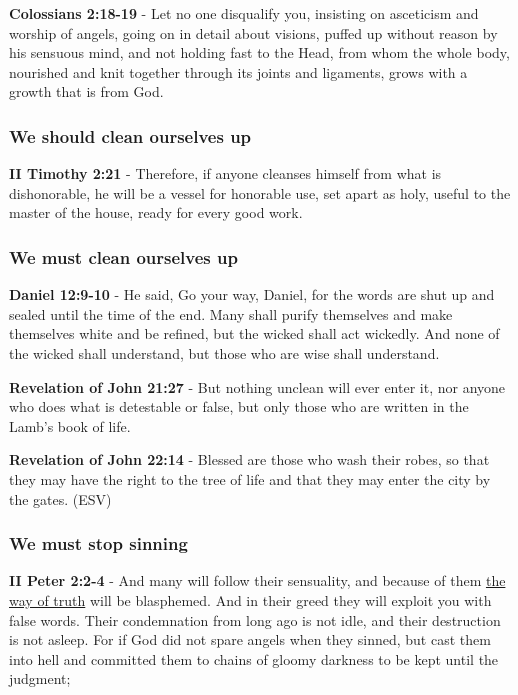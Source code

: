 \documentclass[11pt]{article}
\begin{document}
\textbf{Colossians 2:18-19} - Let no one disqualify you, insisting on asceticism and worship of angels, going on in detail about visions, puffed up without reason by his sensuous mind, and not holding fast to the Head, from whom the whole body, nourished and knit together through its joints and ligaments, grows with a growth that is from God.

\subsubsection{We \textbf{should} clean ourselves up}
\label{sec:org6526507}
\textbf{II Timothy 2:21} - Therefore, if anyone cleanses himself from what is dishonorable, he will be a vessel for honorable use, set apart as holy, useful to the master of the house, ready for every good work.

\subsubsection{We \textbf{must} clean ourselves up}
\label{sec:org9643f94}
\textbf{Daniel 12:9-10} - He said, Go your way, Daniel, for the words are shut up and sealed until the time of the end.  Many shall purify themselves and make themselves white and be refined, but the wicked shall act wickedly. And none of the wicked shall understand, but those who are wise shall understand.

\textbf{Revelation of John 21:27} - But nothing unclean will ever enter it, nor anyone who does what is detestable or false, but only those who are written in the Lamb's book of life.

\textbf{Revelation of John 22:14} - Blessed are those who wash their robes, so that they may have the right to the tree of life and that they may enter the city by the gates. (ESV)

\subsubsection{We must stop sinning}
\label{sec:orgd772311}

\textbf{II Peter 2:2-4} - And many will follow their sensuality, and because of them \uline{the way of truth} will be blasphemed. And in their greed they will exploit you with false words. Their condemnation from long ago is not idle, and their destruction is not asleep. For if God did not spare angels when they sinned, but cast them into hell and committed them to chains of gloomy darkness to be kept until the judgment;
\end{document}

